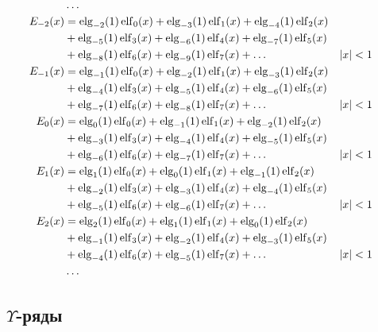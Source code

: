 \begin{equation*} \begin{aligned}
&\ldots \\
%
E_{-2}(x) &=   
  \elg_{-2}(1) \elf_0(x)
+ \elg_{-3}(1) \elf_1(x)  
+ \elg_{-4}(1) \elf_2(x) \\ &
+ \elg_{-5}(1) \elf_3(x)
+ \elg_{-6}(1) \elf_4(x)
+ \elg_{-7}(1) \elf_5(x) \\ &
+ \elg_{-8}(1) \elf_6(x)
+ \elg_{-9}(1) \elf_7(x)
+ \ldots & 
&|x| < 1 \\
%
E_{-1}(x) &=
  \elg_{-1}(1) \elf_0(x)
+ \elg_{-2}(1) \elf_1(x)  
+ \elg_{-3}(1) \elf_2(x) \\ &
+ \elg_{-4}(1) \elf_3(x)
+ \elg_{-5}(1) \elf_4(x)
+ \elg_{-6}(1) \elf_5(x) \\ &
+ \elg_{-7}(1) \elf_6(x)
+ \elg_{-8}(1) \elf_7(x)
+ \ldots & 
&|x| < 1 \\
%
E_0(x) &=
  \elg_0(1) \elf_0(x)
+ \elg_{-1}(1) \elf_1(x)  
+ \elg_{-2}(1) \elf_2(x) \\ &
+ \elg_{-3}(1) \elf_3(x)
+ \elg_{-4}(1) \elf_4(x)
+ \elg_{-5}(1) \elf_5(x) \\ &
+ \elg_{-6}(1) \elf_6(x)
+ \elg_{-7}(1) \elf_7(x)
+ \ldots & 
&|x| < 1 \\
%
E_1(x) &=
  \elg_1(1) \elf_0(x)
+ \elg_0(1) \elf_1(x)
+ \elg_{-1}(1) \elf_2(x) \\ &
+ \elg_{-2}(1) \elf_3(x)
+ \elg_{-3}(1) \elf_4(x)
+ \elg_{-4}(1) \elf_5(x) \\ &
+ \elg_{-5}(1) \elf_6(x)
+ \elg_{-6}(1) \elf_7(x)
+ \ldots & 
&|x| < 1 \\
%
E_2(x) &=
  \elg_2(1) \elf_0(x)
+ \elg_1(1) \elf_1(x)
+ \elg_0(1) \elf_2(x) \\ &
+ \elg_{-1}(1) \elf_3(x)
+ \elg_{-2}(1) \elf_4(x)
+ \elg_{-3}(1) \elf_5(x) \\ &
+ \elg_{-4}(1) \elf_6(x)
+ \elg_{-5}(1) \elf_7(x)
+ \ldots & 
&|x| < 1 \\
%
&\ldots \\
\end{aligned} \end{equation*}

\subsection{$\Upsilon$-ряды}

